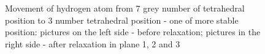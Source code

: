 \begin{figure}[h]
\begin{minipage}[h]{0.5\linewidth}
\end{minipage}
\vfill
\begin{minipage}[h]{0.5\linewidth}
\end{minipage}
\hfill
\begin{minipage}[h]{0.5\linewidth}
\end{minipage}
\caption{Movement of hydrogen atom from 7 grey number of tetrahedral position to 3 number tetrahedral position - one of more stable position: pictures on the left side - before relaxation; pictures in the right side - after relaxation in plane 1, 2 and 3}
\label{7to3}
\end{figure}

